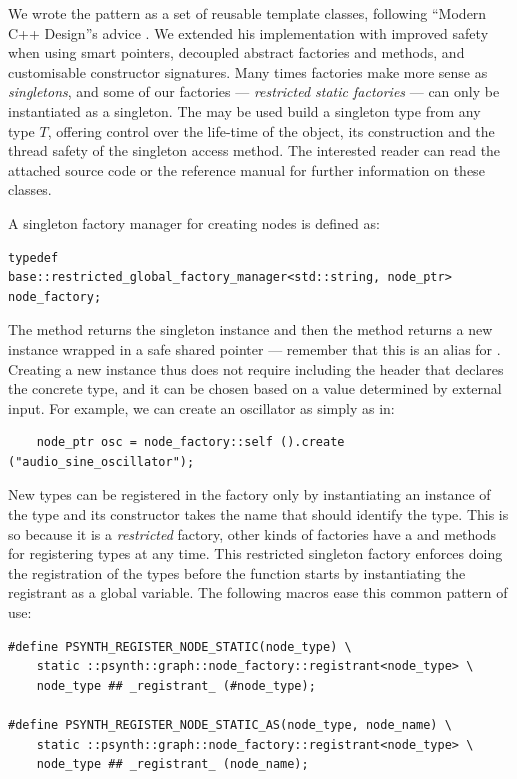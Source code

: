 We wrote the pattern as a set of
reusable template classes, following ``Modern C++ Design''s advice
\cite{alexandrescu01modern}. We extended his implementation with
improved safety when using smart pointers, decoupled abstract
factories and methods, and customisable constructor signatures. Many
times factories make more sense as \emph{singletons}, and some of our
factories --- \emph{restricted static factories} --- can only be
instantiated as a singleton.  The  may be used
build a singleton type from any type $T$, offering control over the
life-time of the object, its construction and the thread safety of the
singleton access method. The interested reader can read the attached
source code or the reference manual for further information on these
classes.

A singleton factory manager for creating nodes is defined as:
\begin{lstlisting}
typedef 
base::restricted_global_factory_manager<std::string, node_ptr>
node_factory;
\end{lstlisting}

The  method returns the singleton instance and then the
 method returns a new instance wrapped
in a safe shared pointer  --- remember that this is an
alias for . Creating a new instance thus
does not require including the header that declares the concrete type,
and it can be chosen based on a value determined by external
input. For example, we can create an oscillator as simply as in:
\begin{lstlisting}
    node_ptr osc = node_factory::self ().create ("audio_sine_oscillator");
\end{lstlisting}

New types can be registered in the factory only by instantiating an
instance of the  type and its
constructor takes the name that should identify the type. This is so
because it is a \emph{restricted} factory, other kinds of factories
have a  and  methods for registering
types at any time. This restricted singleton factory enforces doing
the registration of the types before the  function
starts by instantiating the registrant as a global variable. The
following macros ease this common pattern of use:

\begin{lstlisting}
#define PSYNTH_REGISTER_NODE_STATIC(node_type) \
    static ::psynth::graph::node_factory::registrant<node_type> \
    node_type ## _registrant_ (#node_type);

#define PSYNTH_REGISTER_NODE_STATIC_AS(node_type, node_name) \
    static ::psynth::graph::node_factory::registrant<node_type> \
    node_type ## _registrant_ (node_name);
\end{lstlisting}

